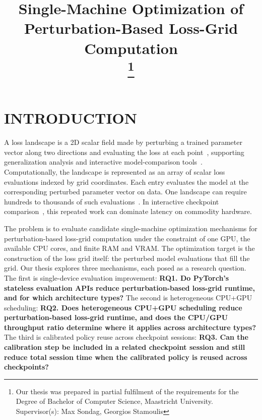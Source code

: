 \documentclass[conference]{IEEEtran}
\begin{document}
\title{Single-Machine Optimization of Perturbation-Based Loss-Grid Computation\\
\thanks{Our thesis was prepared in partial fulfilment of the requirements for the Degree of Bachelor of Computer Science, Maastricht University. Supervisor(s): Max Sondag, Georgios Stamoulis}
}

\author{
}

\maketitle



\section{INTRODUCTION}\label{introduction}

A loss landscape is a 2D
scalar field made by perturbing a trained parameter vector
along two directions and evaluating the loss at each
point~\cite{li2018losslandscape}, supporting
generalization analysis and interactive
model-comparison tools~\cite{xie2025losslens,losslens_repo}.
Computationally, the landscape is represented as an array of
scalar loss evaluations indexed by grid coordinates. Each entry
evaluates the model at the corresponding perturbed parameter
vector on data. One landscape can require hundreds to thousands
of such
evaluations~\cite{li2018losslandscape,goldstein_loss_landscape_repo}.
In interactive checkpoint comparison~\cite{xie2025losslens},
this repeated work can dominate latency on commodity hardware.

The problem is to evaluate candidate single-machine optimization
mechanisms for perturbation-based loss-grid computation under the
constraint of one GPU, the available CPU cores, and finite RAM
and VRAM. The optimization target is the construction of the
loss grid itself: the perturbed model evaluations that fill the
grid. Our thesis explores three mechanisms, each posed as a
research question. The first is single-device evaluation
improvement: \textbf{RQ1. Do PyTorch's stateless evaluation APIs
reduce perturbation-based loss-grid runtime, and for which
architecture types?} The second is heterogeneous CPU+GPU
scheduling: \textbf{RQ2. Does heterogeneous CPU+GPU scheduling
reduce perturbation-based loss-grid runtime, and does the CPU/GPU
throughput ratio determine where it applies across architecture
types?} The third is calibrated policy reuse across checkpoint
sessions: \textbf{RQ3. Can the calibration step be included in a
related checkpoint session and still reduce total session time
when the calibrated policy is reused across checkpoints?}
\end{document}
